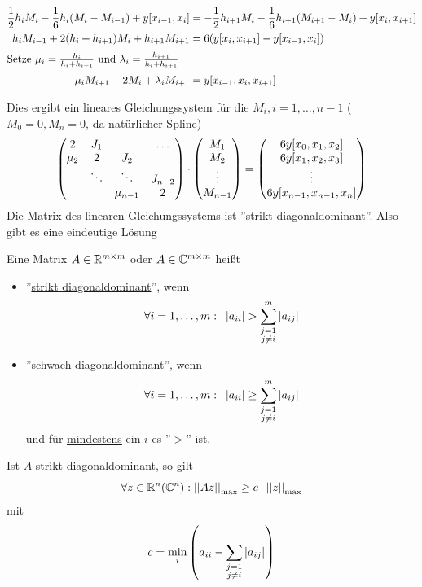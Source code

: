 \documentclass[../Skript.tex]{subfiles}
\begin{document}
\begin{align*}
    \frac{1}{2}h_iM_i-\frac{1}{6}h_i(M_i-M_{i-1})+y[x_{i-1},x_i]&=
    -\frac{1}{2}h_{i+1}M_i-\frac{1}{6}h_{i+1}(M_{i+1}-M_{i})+y[x_{i},x_{i+1}] \\
    h_iM_{i-1}+2(h_i+h_{i+1})M_i+h_{i+1}M_{i+1} &= 6(y[x_{i},x_{i+1}]-y[x_{i-1},x_i]) \\
    \intertext{Setze \(\mu_i = \frac{h_i}{h_i+h_{i+1}}\) und \(\lambda_i=\frac{h_{i+1}}{h_i+h_{i+1}}\)}
    \mu_iM_{i+1}+2M_i+\lambda_iM_{i+1}&=y[x_{i-1},x_i,x_{i+1}]
\end{align*}

Dies ergibt ein lineares Gleichungssystem für die $M_i, i=1,\dots,n-1$ ($M_0 = 0, M_n = 0$, da natürlicher Spline)
\[
    \matrx{2&J_1&\ &\dots\\\mu_2&2&J_2& \ \\\ &\ddots&\ddots&J_{n-2}\\\ & \ & \mu_{n-1}&2}\cdot \matrx{
        M_1\\M_2\\\vdots\\M_{n-1}} = \matrx{6y[x_0,x_1,x_2]\\ 6y[x_1,x_2,x_3]\\\vdots\\6y[x_{n-1},x_{n-1},x_n]}
    \]
Die Matrix des linearen Gleichungssystems ist ''strikt diagonaldominant''. Also gibt es eine 
eindeutige Lösung\begin{definition}
    Eine Matrix $A\in \mathbb{R}^{m\times m}$ oder $A\in \mathbb{C}^{m\times m}$ heißt \begin{itemize}\item''\underline{strikt 
    diagonaldominant}'',
    wenn \[
        \forall i=1,\dots,m: \hspace{.5em}\left\vert a_{ii} \right\vert > \displaystyle\sum_{\substack{j=1\\j\neq i}}^m \left\vert a_{ij} \right\vert\]
    \item''\underline{schwach diagonaldominant}'', wenn \[
        \forall i=1,\dots,m: \hspace{.5em}\left\vert a_{ii} \right\vert \geq \displaystyle\sum_{\substack{j=1\\j\neq i}}^m\left\vert a_{ij} \right\vert\]
    und für \underline{mindestens} ein $i$ es ''$>$'' ist.
    \end{itemize}
\end{definition}
\begin{lemma}
    Ist $A$ strikt diagonaldominant, so gilt \[
        \forall z\in\mathbb{R}^n(\mathbb{C}^n): \left\vert\left\vert Az\right\vert\right\vert_{\max} \geq c\cdot \left\vert\left\vert z\right\vert\right\vert_{\max}\]
    mit \[
        c = \min_i\left(a_{ii} - \displaystyle\sum_{\substack{j=1\\j\neq i}}\left\vert a_{ij} \right\vert\right)\]
\end{lemma}
\end{document}
